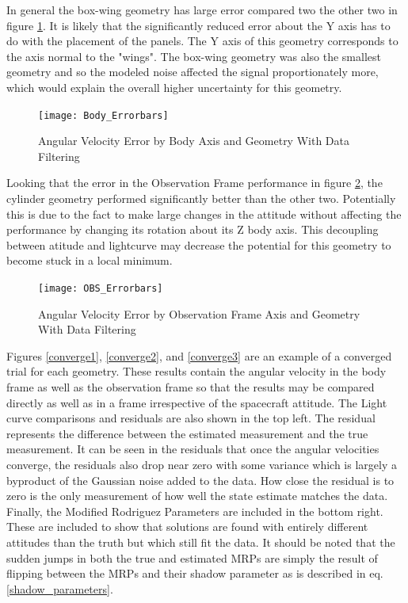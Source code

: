 In general the box-wing geometry has large error compared two the other two in figure \ref{BodyErrors}. It is likely that the significantly reduced error about the Y axis has to do with the placement of the panels. The Y axis of this geometry corresponds to the axis normal to the "wings". The box-wing geometry was also the smallest geometry and so the modeled noise affected the signal proportionately more, which would explain the overall higher uncertainty for this geometry.


\begin{figure}[h!]
	\begin{center}
		\texttt{[image: Body\_Errorbars]}
		
	\end{center}
	\caption{Angular Velocity Error by Body Axis and Geometry With Data Filtering}
	\label{BodyErrors}
\end{figure}

Looking that the error in the Observation Frame performance in figure \ref{obs errors}, the cylinder geometry performed significantly better than the other two. Potentially this is due to the fact to make large changes in the attitude without affecting the performance by changing its rotation about its Z body axis. This decoupling between atitude and lightcurve may decrease the potential for this geometry to become stuck in a local minimum.

\begin{figure}[h!] 
	\begin{center}
		\texttt{[image: OBS\_Errorbars]}
		\caption{Angular Velocity Error by Observation Frame Axis and Geometry With Data Filtering}
		\label{obs errors}
	\end{center}
\end{figure}

Figures \ref{converge1}, \ref{converge2}, and \ref{converge3} are an example of a converged trial for each geometry. These results contain the angular velocity in the body frame as well as the observation frame so that the results may be compared directly as well as in a frame irrespective of the spacecraft attitude. The Light curve comparisons and residuals are also shown in the top left. The residual represents the difference between the estimated measurement and the true measurement. It can be seen in the residuals that  once the angular velocities converge, the residuals also drop near zero with some variance which is largely a byproduct of the Gaussian noise added to the data. How close the residual is to zero is the only measurement of how well the state estimate matches the data. Finally, the Modified Rodriguez Parameters are included in the bottom right. These are included to show that solutions are found with entirely different attitudes than the truth but which still fit the data. It should be noted that the sudden jumps in both the true and estimated MRPs are simply the result of flipping between the MRPs and their shadow parameter as is described in eq. \ref{shadow_parameters}.

